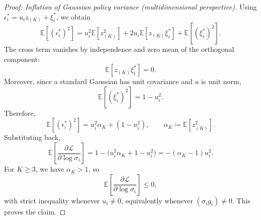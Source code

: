 \begin{proof}[Proof: Inflation of Gaussian policy variance (multidimensional perspective)]
Using $\epsilon_i^*=u_i z_{(K)}+\xi_i^*$, we obtain
\[
\mathbb E[(\epsilon_i^*)^2]
=
u_i^2 \mathbb E[z_{(K)}^2]
+
2u_i \mathbb E[z_{(K)}\xi_i^*]
+
\mathbb E[(\xi_i^*)^2].
\]
The cross term vanishes by independence and zero mean of the orthogonal component:
\[
\mathbb E[z_{(K)}\xi_i^*]=0.
\]
Moreover, since a standard Gaussian has unit covariance and $u$ is unit norm,
\[
\mathbb E[(\xi_i^*)^2]=1-u_i^2.
\]
Therefore,
\[
\mathbb E[(\epsilon_i^*)^2]
=
u_i^2 \alpha_K + (1-u_i^2),
\qquad
\alpha_K\coloneq \mathbb E[z_{(K)}^2].
\]
Substituting back,
\[
\mathbb E\!\left[\frac{\partial \mathcal L}{\partial \log \sigma_i}\right]
=
1-\big(u_i^2\alpha_K + 1-u_i^2\big)
=
-(\alpha_K-1)u_i^2.
\]
For $K\ge 3$, we have $\alpha_K>1$, so
\[
\mathbb E\!\left[\frac{\partial \mathcal L}{\partial \log \sigma_i}\right]\le 0,
\]
with strict inequality whenever $u_i\neq 0$, equivalently whenever $(\sigma_i g_i)\neq 0$.
This proves the claim.
\end{proof}

